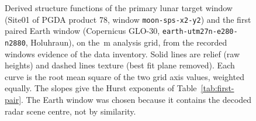 \begin{figure}[tbp]
\centering
{}
\caption{Derived structure functions of the primary lunar target window (Site01 of PGDA product 78,
window \texttt{moon-sps-x2-y2}) and the first paired Earth window (Copernicus GLO-30,
\texttt{earth-utm27n-e280-n2880}, Holuhraun), on the \ConfigGridM\,m analysis grid, from the
recorded windows evidence of the data inventory. Solid lines are relief (raw heights) and dashed lines
texture (best fit plane removed). Each curve is the root mean square of the two grid axis values, weighted equally. The
slopes give the Hurst exponents of Table~\ref{tab:first-pair}. The Earth window was chosen because
it contains the decoded radar scene centre, not by similarity.}
\label{fig:structure-functions}
\end{figure}
